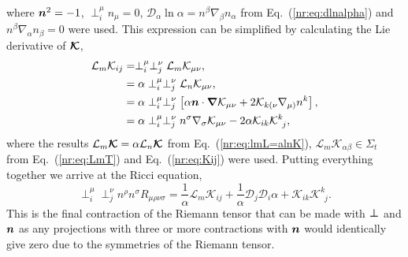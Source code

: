 where $\boldsymbol{n}^2 =-1$, $\perp_i^\mu n_\mu =0$, $\mathcal{D}_\alpha \ln \alpha = n^\beta \nabla_\beta n_\alpha$ from Eq.~(\ref{nr:eq:dlnalpha}) and $n^\beta \nabla_\alpha n_\beta =0$ were used. This expression can be simplified by calculating the Lie derivative of $\boldsymbol{\mathcal{K}}$,
\begin{align}
 \mathcal{L}_m \mathcal{K}_{ij}  &= \perp^\mu_i\perp^\nu_j\mathcal{L}_m \mathcal{K}_{\mu\nu} ,\\ &= \alpha\perp^\mu_i\perp^\nu_j\mathcal{L}_n \mathcal{K}_{\mu\nu} ,\\
 & =\alpha \perp^\mu_i\perp^\nu_j\left[ \alpha \boldsymbol{n}\cdot \boldsymbol{\nabla} \mathcal{K}_{\mu\nu} + 2 \mathcal{K}_{k(\nu}\nabla_{\mu)}n^k\right], \\
&= \alpha \perp^\mu_i\perp^\nu_j n^\sigma \nabla_\sigma \mathcal{K}_{\mu\nu} - 2\alpha\mathcal{K}_{ik}\mathcal{K}^k_{\,\,\,j},
 \end{align}
where the results $\mathcal{L}_m \boldsymbol{\mathcal{K}} = \alpha \mathcal{L}_n \boldsymbol{\mathcal{K}}$ from Eq.~(\ref{nr:eq:lmL=alnK}), $\mathcal{L}_m\mathcal{K}_{\alpha\beta} \in \Sigma_t$ from Eq.~(\ref{nr:eq:LmT}) and Eq.~(\ref{nr:eq:Kij}) were used. Putting everything together we arrive at the Ricci equation,
\begin{equation}\perp^\mu_{i} \perp^\nu_j n^\rho n^\sigma R_{\mu\rho\nu\sigma} = \frac{1}{\alpha}\mathcal{L}_m \mathcal{K}_{ij} +\frac{1}{\alpha}\mathcal{D}_j\mathcal{D}_i \alpha +\mathcal{K}_{ik}\mathcal{K}^k_{\,\,\,j}.  \label{nr:eq:riccieq}\end{equation}
This is the final contraction of the Riemann tensor that can be made with $\boldsymbol{\perp}$ and $\boldsymbol{n}$ as any projections with three or more contractions with $\boldsymbol{n}$ would identically give zero due to the symmetries of the Riemann tensor.


